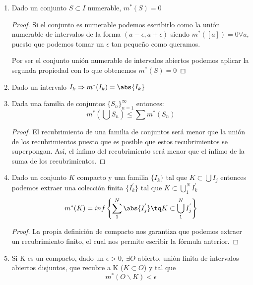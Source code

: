 \documentclass{apuntes}
\begin{document}
\begin{enumerate}
\begin{proof}
Por tanto queda claro que no puede ser $m^*(S) < inf\left\{m^*(O)\right\}$.
\end{proof}

De esta propiedad puede extraerse que $ m^*(S) = m^*(O)$

%
\item Dado un conjunto $S \subset I$  numerable, $m^*(S)=0$
\begin{proof}
Si el conjunto es numerable podemos escribirlo como la unión numerable de intervalos de la forma $(a-\epsilon, a +\epsilon)$ siendo $m^*([a])=0 \forall a$, puesto que podemos tomar un $\epsilon$ tan pequeño como queramos.

Por ser el conjunto unión numerable de intervalos abiertos podemos aplicar la segunda propiedad con lo que obtenemos $m^*(S)=0$
\end{proof}

%
\item Dado un intervalo $I_k \Rightarrow m^*(I_k)=\abs{I_k}$

%
\item Dada una familia de conjuntos $\lbrace S_n\rbrace_{n=1}^{\infty}$  entonces:
\[m^*(\bigcup S_n) \leq \sum m^*(S_n)\]
\begin{proof}
El recubrimiento de una familia de conjuntos será menor que la unión de los recubrimientos puesto que es posible que estos recubrimientos se superpongan. Así, el ínfimo del recubrimiento será menor que el ínfimo de la suma de los recubrimientos.
\end{proof}


%
\item Dado un conjunto $K$ compacto y una familia $\lbrace I_k \rbrace$ tal que $K \subset \bigcup I_j$ entonces podemos extraer una colección finita $\lbrace I_k^{'} \rbrace$ tal que $K \subset \bigcup_1^N I_k^{'}$
\[m^*(K) = inf\left\{\sum_1^N \abs{I_j^{'}} \tq K\subset \bigcup_1^N I_j^{'} \right\}\]
\begin{proof}
La propia definición de compacto nos garantiza que podemos extraer un recubrimiento finito, el cual nos permite escribir la fórmula anterior.
\end{proof}

%
\item Si K es un compacto, dado un $\epsilon > 0, \ \exists O$ abierto, unión finita de intervalos abiertos disjuntos, que recubre a K ($K\subset O$) y tal que
\[m^*(O\smallsetminus K) < \epsilon\]


\end{enumerate}
\end{document}
